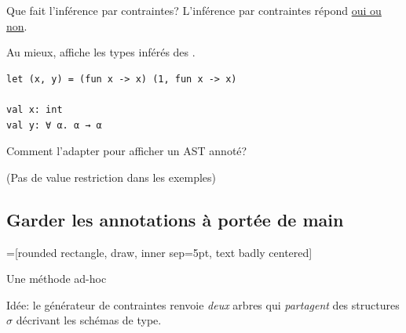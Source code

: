 \documentclass[final]{beamer}
\begin{document}
\newcommand{\red}[1]{\textcolor[HTML]{a40000}{#1}}

\begin{frame}[fragile]{Que fait l'inférence par contraintes?}
  L'inférence par contraintes répond \underline{oui ou non}.

  Au mieux, affiche les types inférés des \underline{}.
  \begin{verbatim}
let (x, y) = (fun x -> x) (1, fun x -> x)

val x: int
val y: ∀ α. α → α
  \end{verbatim}

  \textcolor[HTML]{a40000}{Comment l'adapter pour afficher un AST annoté?}

  \begin{flushright}
    \footnotesize(Pas de value restriction dans les exemples)
  \end{flushright}
\end{frame}

\subsection{Garder les annotations à portée de main}

=[rounded rectangle, draw,
        inner sep=5pt,
        text badly centered]

\newcommand{\redsigma}{\ensuremath{\red{\boldsymbol\sigma}}}

\begin{frame}{Une méthode ad-hoc}
  \begin{center}
    \footnotesize
  \end{center}
  Idée: le générateur de contraintes renvoie \emph{deux} arbres qui
  \emph{\red{partagent}} des structures $\sigma$ décrivant les schémas de type.
\end{frame}
\end{document}
